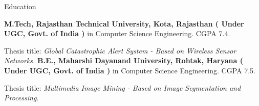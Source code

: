 \begin{rubric}{Education}

\entry*[2009 -- 2011]%
	\textbf{M.Tech, Rajasthan Technical University, Kota, Rajasthan ( Under UGC, Govt. of India )} in Computer Science Engineering. CGPA 7.4.
	\par Thesis title: \emph{Global Catastrophic Alert System - Based on Wireless Sensor Networks.}
%
\entry*[2005 -- 2009]%
	\textbf{B.E., Maharshi Dayanand University, Rohtak, Haryana ( Under UGC, Govt. of India )} in Computer Science Engineering. CGPA 7.5.\par
	Thesis title: \emph{Multimedia Image Mining - Based on Image Segmentation and Processing}.
\end{rubric}